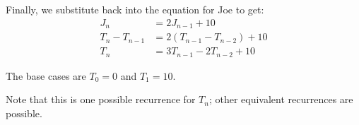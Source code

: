 \documentclass[12pt,oneside]{article}
\begin{document}
\begin{problem}{10}
{\vspace{0.2in}
Finally, we substitute back into the equation for Joe to get:
\begin{align*}
J_n &= 2J_{n-1} + 10 \\
T_n - T_{n-1} &= 2(T_{n-1} - T_{n-2}) + 10 \\
T_n &= 3T_{n-1} - 2T_{n-2} + 10
\end{align*}

The base cases are $T_0 = 0$ and $T_1 = 10$.

Note that this is one possible recurrence for $T_n$; other equivalent recurrences are possible.

}
\end{problem}
\end{document}
